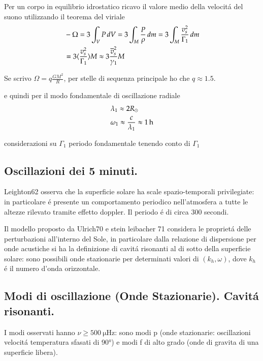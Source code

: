 \documentclass[../main.tex]{subfiles}
\begin{document}
Per un corpo in equilibrio idrostatico ricavo il valore medio della velocit\'a del suono utilizzando il teorema del viriale
\begin{align*}
    &-\Omega=3\int_VP\,dV=3\int_M\frac{P}{\rho}\,dm=3\int_M\frac{v_s^2}{\Gamma_1}\,dm\\
    &=3\langle \frac{v_s^2}{\Gamma_1} \rangle M\approx3\frac{\overline{v}_s^2}{\gamma_1}M
\end{align*}

Se scrivo $\Omega=q\frac{GM^2}{R}$, per stelle di sequenza principale ho che $q\approx1.5$.

e quindi per il modo fondamentale di oscillazione radiale
\begin{align*}
    &\lambda_1\approx 2R_{\odot}{}\\
    &\omega_1\approx\frac{c}{\lambda_1}\approx\SI{1}{\hour}
\end{align*}

\begin{todo}{considerazioni su $\Gamma_1$}
periodo fondamentale tenendo conto di $\Gamma_1$ 
\end{todo}

\subsection{Oscillazioni dei 5 minuti.}

Leighton62 osserva che la superficie solare ha scale spazio-temporali privilegiate: in particolare \'e presente un comportamento periodico nell'atmosfera a tutte le altezze rilevato tramite effetto doppler. Il periodo \'e di circa 300 secondi.

Il modello proposto da Ulrich70 e stein leibacher 71 considera le propriet\'a delle perturbazioni all'interno del Sole, in particolare dalla relazione di dispersione per onde acustiche si ha la definizione di cavit\'a risonanti al di sotto della superficie solare: sono possibili onde stazionarie per determinati valori di  $(k_h,\omega)$, dove $k_h$ \'e il numero d'onda orizzontale.

\subsection{Modi di oscillazione (Onde Stazionarie). Cavit\'a risonanti.}

I modi osservati hanno $\nu\geq\SI{500}{\micro\hertz}$: sono modi p (onde stazionarie: oscillazioni velocit\'a temperatura sfasati di \ang{90}) e modi f di alto grado (onde di gravita di una superficie libera).
\end{document}
